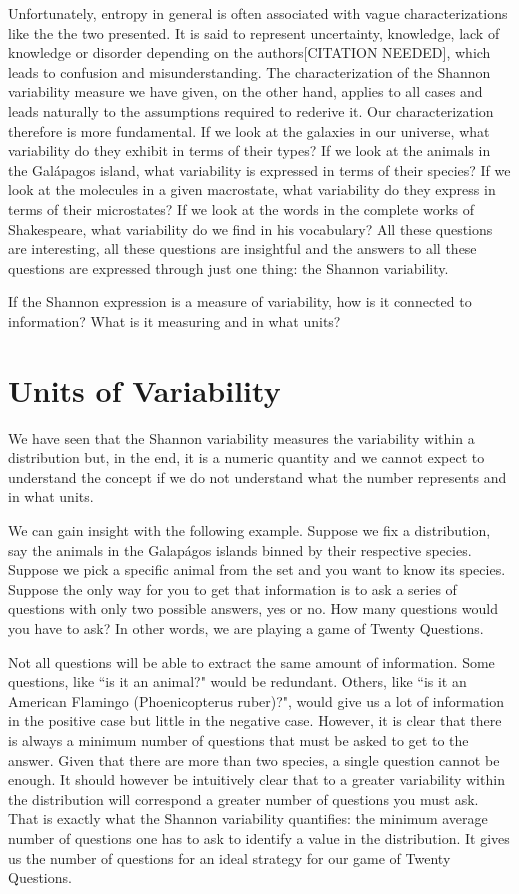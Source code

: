 \documentclass{article}
\begin{document}
Unfortunately, entropy in general is often associated with vague characterizations like the the two presented. It is said to represent uncertainty, knowledge, lack of knowledge or disorder depending on the authors[CITATION NEEDED], which leads to confusion and misunderstanding.  The characterization of the Shannon variability measure we have given, on the other hand, applies to all cases and leads naturally to the assumptions required to rederive it. Our characterization therefore is more fundamental. If we look at the galaxies in our universe, what variability do they exhibit in terms of their types? If we look at the animals in the Gal\'{a}pagos island, what variability is expressed in terms of their species? If we look at the molecules in a given macrostate, what variability do they express in terms of their microstates? If we look at the words in the complete works of Shakespeare, what variability do we find in his vocabulary? All these questions are interesting, all these questions are insightful and the answers to all these questions are expressed through just one thing: the Shannon variability.

If the Shannon expression is a measure of variability, how is it connected to information? What is it measuring and in what units?

\section{Units of Variability\label{uv}}



We have seen that the Shannon variability measures the variability within a distribution but, in the end, it is a numeric quantity and we cannot expect to understand the concept if we do not understand what the number represents and in what units.

We can gain insight with the following example. Suppose we fix a distribution, say the animals in the Galap\'{a}gos islands binned by their respective species. Suppose we pick a specific animal from the set and you want to know its species. Suppose the only way for you to get that information is to ask a series of questions with only two possible answers, yes or no. How many questions would you have to ask? In other words, we are playing a game of Twenty Questions.

Not all questions will be able to extract the same amount of information. Some questions, like ``is it an animal?" would be redundant. Others, like ``is it an American Flamingo (Phoenicopterus ruber)?", would give us a lot of information in the positive case but little in the negative case. However, it is clear that there is always a minimum number of questions that must be asked to get to the answer. Given that there are more than two species, a single question cannot be enough. It should however be intuitively clear that to a greater variability within the distribution will correspond a greater number of questions you must ask. That is exactly what the Shannon variability quantifies: the minimum average number of questions one has to ask to identify a value in the distribution. It gives us the number of questions for an ideal strategy for our game of Twenty Questions.
\end{document}
